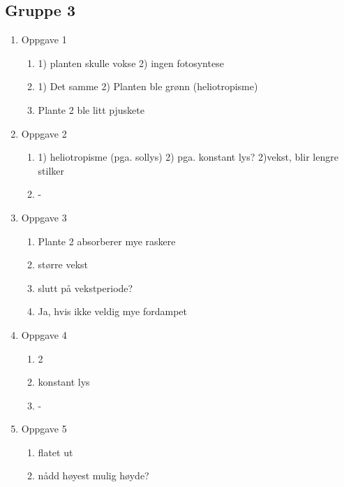  
 


\subsection{Gruppe 3}
\begin{enumerate}
	\item Oppgave 1
	\begin{enumerate}
		\item 1) planten skulle vokse 2) ingen fotosyntese
		\item 1) Det samme 2) Planten ble grønn (heliotropisme) 
		\item Plante 2 ble litt pjuskete
	\end{enumerate}

	\item Oppgave 2
	\begin{enumerate}
		\item 1) heliotropisme (pga. sollys) 2) pga. konstant lys? 2)vekst, blir lengre stilker
		\item - 
	\end{enumerate}	

	\item Oppgave 3
	\begin{enumerate}
		\item Plante 2 absorberer mye raskere
		\item større vekst
		\item slutt på vekstperiode?
		\item Ja, hvis ikke veldig mye fordampet
	\end{enumerate}

	\item Oppgave 4
	\begin{enumerate}
		\item 2
		\item konstant lys
		\item -
	\end{enumerate}

	\item Oppgave 5
	\begin{enumerate}
		\item flatet ut
		\item nådd høyest mulig høyde?
	\end{enumerate}
\end{enumerate}
\newpage
